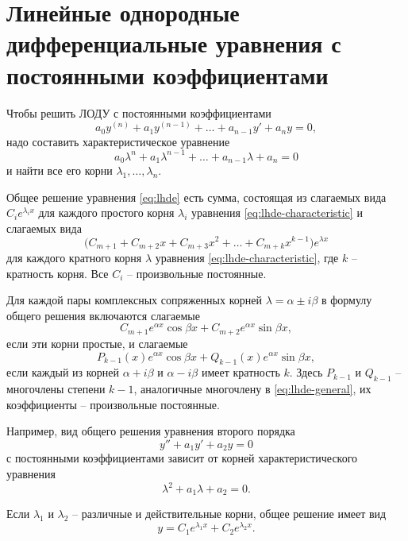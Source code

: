 \documentclass[a5paper, 11pt]{extbook}
\theoremstyle{definition}
\theoremstyle{definition}
\begin{document}
\section{Линейные однородные дифференциальные уравнения с постоянными коэффициентами}

Чтобы решить ЛОДУ с постоянными коэффициентами
\begin{equation}
    \label{eq:lhde}
    a_0 y^{(n)} + a_1 y^{(n - 1)} + \ldots + a_{n - 1} y' + a_n y = 0,
\end{equation}
надо составить характеристическое уравнение
\begin{equation}
    \label{eq:lhde-characteristic}
    a_0 \lambda^n + a_1 \lambda^{n - 1} + \ldots + a_{n - 1} \lambda + a_n = 0
\end{equation}
и найти все его корни \(\lambda_1, \ldots, \lambda_n\).

Общее решение уравнения \eqref{eq:lhde} есть сумма, состоящая из слагаемых вида \(C_i e^{\lambda_i x}\) для каждого простого корня \(\lambda_i\) уравнения \eqref{eq:lhde-characteristic} и слагаемых вида
\begin{equation}
    \label{eq:lhde-general}
    \big( C_{m + 1} + C_{m + 2}x + C_{m + 3}x^2 + \ldots + C_{m + k} x^{k - 1} \big) e^{\lambda x}
\end{equation}
для каждого кратного корня \(\lambda\) уравнения \eqref{eq:lhde-characteristic}, где \(k\) -- кратность корня. Все \(C_i\) -- произвольные постоянные.

Для каждой пары комплексных сопряженных корней \(\lambda = \alpha \pm i \beta\) в формулу общего решения включаются слагаемые
\[
    C_{m + 1} e^{\alpha x} \cos \beta x + C_{m + 2} e^{\alpha x} \sin \beta x,
\]
если эти корни простые, и слагаемые
\[
    P_{k - 1}(x) e^{\alpha x} \cos{\beta x} + Q_{k - 1}(x) e^{\alpha x} \sin{\beta x},
\]
если каждый из корней \(\alpha + i \beta\) и \(\alpha - i \beta\) имеет кратность \(k\). Здесь \(P_{k - 1}\) и \(Q_{k - 1}\) -- многочлены степени \(k - 1\), аналогичные многочлену в \eqref{eq:lhde-general}, их коэффициенты -- произвольные постоянные.

Например, вид общего решения уравнения второго порядка
\[
    y'' + a_1 y' + a_2 y = 0
\]
с постоянными коэффициентами зависит от корней характеристического уравнения
\[
    \lambda^2 + a_1 \lambda + a_2 = 0.
\]

Если \(\lambda_1\) и \(\lambda_2\) -- различные и действительные корни, общее решение имеет вид
\[
    y = C_1 e^{\lambda_1 x} + C_2 e^{\lambda_2 x}.
\]
\end{document}

